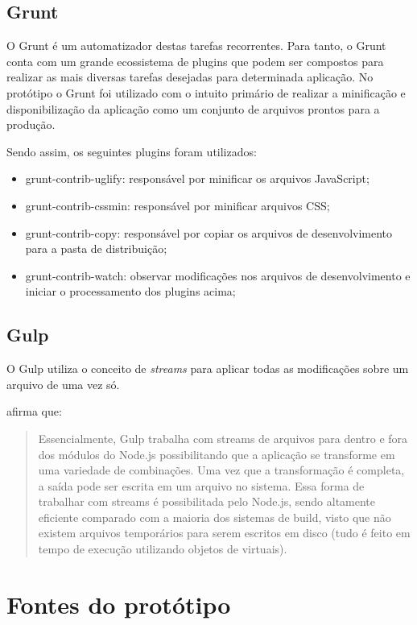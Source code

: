 \section{Grunt} 
\label{grunt}

O Grunt é um automatizador destas tarefas recorrentes. Para tanto, o
Grunt conta com um grande ecossistema de plugins que podem ser compostos
para realizar as mais diversas tarefas desejadas para determinada
aplicação. No protótipo o Grunt foi utilizado com o intuito primário
de realizar a minificação e disponibilização da aplicação como um
conjunto de arquivos prontos para a produção.

Sendo assim, os seguintes plugins foram utilizados:
\begin{itemize}
    \item grunt-contrib-uglify: responsável por minificar os arquivos JavaScript;
    \item grunt-contrib-cssmin: responsável por minificar arquivos CSS;
    \item grunt-contrib-copy: responsável por copiar os arquivos de desenvolvimento para a pasta de distribuição;
    \item grunt-contrib-watch: observar modificações nos arquivos de desenvolvimento e iniciar o processamento dos plugins acima;
\end{itemize}

\section{Gulp}

O Gulp utiliza o conceito de \textit{streams} para aplicar todas as
modificações sobre um arquivo de uma vez só.

\citet{crossPlatformMobileGame} afirma que:
\begin{quote}
Essencialmente, Gulp trabalha com streams de arquivos para dentro e fora
dos módulos do Node.js possibilitando que a aplicação se transforme
em uma variedade de combinações. Uma vez que a transformação é
completa, a saída pode ser escrita em um arquivo no sistema. Essa forma
de trabalhar com streams é possibilitada pelo Node.js, sendo altamente
eficiente comparado com a maioria dos sistemas de build, visto que não
existem arquivos temporários para serem escritos em disco (tudo é
feito em tempo de execução utilizando objetos de virtuais).
\end{quote}

\chapter{Fontes do protótipo}


